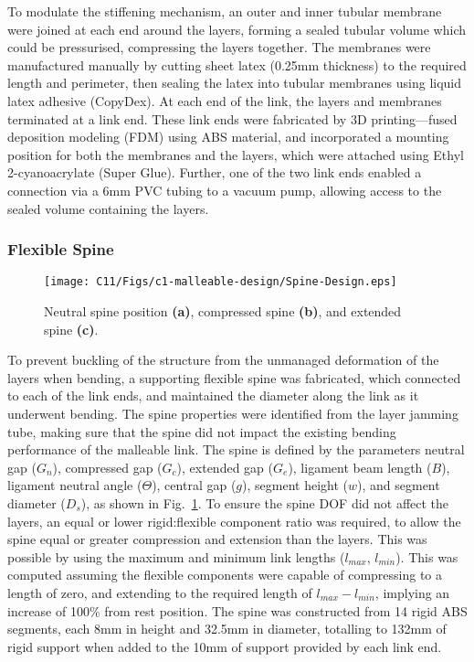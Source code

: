 To modulate the stiffening mechanism, an outer and inner tubular membrane were joined at each end around the layers, forming a sealed tubular volume which could be pressurised, compressing the layers together. The membranes were manufactured manually by cutting sheet latex (0.25mm thickness) to the required length and perimeter, then sealing the latex into tubular membranes using liquid latex adhesive (CopyDex). At each end of the link, the layers and membranes terminated at a link end. These link ends were fabricated by 3D printing---fused deposition modeling (FDM) using ABS material, and incorporated a mounting position for both the membranes and the layers, which were attached using Ethyl 2-cyanoacrylate (Super Glue). Further, one of the two link ends enabled a connection via a 6mm PVC tubing to a vacuum pump, allowing access to the sealed volume containing the layers.

\subsubsection{Flexible Spine}


\begin{figure}[!t]
    \centering
    \texttt{[image: C11/Figs/c1-malleable-design/Spine-Design.eps]}
    \caption{Neutral spine position {\bf (a)}, compressed spine {\bf (b)}, and extended spine {\bf (c)}.}
    \label{SpineDesign}
\end{figure}

To prevent buckling of the structure from the unmanaged deformation of the layers when bending, a supporting flexible spine was fabricated, which connected to each of the link ends, and maintained the diameter along the link as it underwent bending. The spine properties were identified from the layer jamming tube, making sure that the spine did not impact the existing bending performance of the malleable link. The spine is defined by the parameters neutral gap ($G_n$), compressed gap ($G_c$), extended gap ($G_e$), ligament beam length ($B$), ligament neutral angle ($\Theta$), central gap ($g$), segment height ($w$), and segment diameter ($D_s$), as shown in Fig.~\ref{SpineDesign}. To ensure the spine DOF did not affect the layers, an equal or lower rigid:flexible component ratio was required, to allow the spine equal or greater compression and extension than the layers. This was possible by using the maximum and minimum link lengths ($l_{max}$, $l_{min}$). This was computed assuming the flexible components were capable of compressing to a length of zero, and extending to the required length of $l_{max}-l_{min}$, implying an increase of 100\% from rest position. The spine was constructed from 14 rigid ABS segments, each 8mm in height and 32.5mm in diameter, totalling to 132mm of rigid support when added to the 10mm of support provided by each link end.

